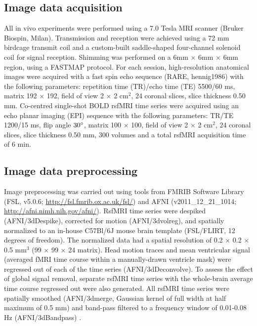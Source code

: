 \subsection{Image data acquisition}
All in vivo experiments were performed using a 7.0 Tesla MRI scanner (Bruker
Biospin, Milan). Transmission and reception were achieved using a 72 mm birdcage
transmit coil and a custom-built saddle-shaped four-channel solenoid coil for
signal reception. Shimming was performed on a 6mm $\times$ 6mm $\times$ 6mm
region, using a FASTMAP protocol. For each session, high-resolution anatomical
images were acquired with a fast spin echo sequence (RARE, hennig1986) with the
following parameters: repetition time (TR)/echo time (TE) 5500/60 ms, matrix 192
$\times$ 192, field of view 2 $\times$ 2 $\text{cm}^2$, 24 coronal slices, slice
thickness 0.50 mm. Co-centred single-shot BOLD rsfMRI time series were acquired
using an echo planar imaging (EPI) sequence with the following parameters: TR/TE
1200/15 ms, flip angle $30\degree$, matrix 100 $\times$ 100, field of view 2
$\times$ 2 $\text{cm}^2$, 24 coronal slices, slice thickness 0.50 mm, 300
volumes and a total rsfMRI acquisition time of 6 min.

\subsection{Image data preprocessing}
Image preprocessing was carried out using tools from FMRIB Software Library
(FSL, v5.0.6; \url{http://fsl.fmrib.ox.ac.uk/fsl/}) \parencite{jenkinson2012}
and AFNI (v2011\_12\_21\_1014; \url{http://afni.nimh.nih.gov/afni/}). RsfMRI
time series were despiked (AFNI/3dDespike), corrected for motion
(AFNI/3dvolreg), and spatially normalized to an in-house C57Bl/6J mouse brain
template \parencite{sforazzini2016} (FSL/FLIRT, 12 degrees of freedom). The
normalized data had a spatial resolution of 0.2 $\times$ 0.2 $\times$ 0.5
$\text{mm}^3$ (99 $\times$ 99 $\times$ 24 matrix). Head motion traces and mean
ventricular signal (averaged fMRI time course within a manually-drawn ventricle
mask) were regressed out of each of the time series (AFNI/3dDeconvolve). To
assess the effect of global signal removal, separate rsfMRI time series with the
whole-brain average time course regressed out were also generated. All rsfMRI
time series were spatially smoothed (AFNI/3dmerge, Gaussian kernel of full width
at half maximum of 0.5 mm) and band-pass filtered to a frequency window of
0.01-0.08 Hz (AFNI/3dBandpass) \parencite{sforazzini2016}.

